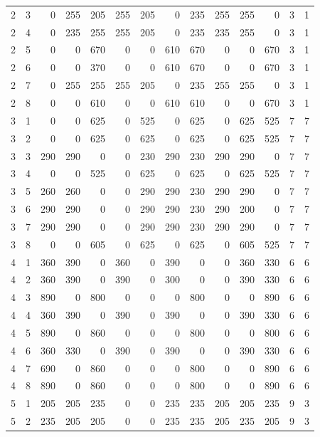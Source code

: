 {\begin{longtable}{cc*{10}{r}cc}
2 & 3 & 0 & 255 & 205 & 255 & 205 & 0 & 235 & 255 & 255 & 0 & 3 & 1 \\
2 & 4 & 0 & 235 & 255 & 255 & 205 & 0 & 235 & 235 & 255 & 0 & 3 & 1 \\
2 & 5 & 0 & 0 & 670 & 0 & 0 & 610 & 670 & 0 & 0 & 670 & 3 & 1 \\
2 & 6 & 0 & 0 & 370 & 0 & 0 & 610 & 670 & 0 & 0 & 670 & 3 & 1 \\
2 & 7 & 0 & 255 & 255 & 255 & 205 & 0 & 235 & 255 & 255 & 0 & 3 & 1 \\
2 & 8 & 0 & 0 & 610 & 0 & 0 & 610 & 610 & 0 & 0 & 670 & 3 & 1 \\\midrule
3 & 1 & 0 & 0 & 625 & 0 & 525 & 0 & 625 & 0 & 625 & 525 & 7 & 7 \\
3 & 2 & 0 & 0 & 625 & 0 & 625 & 0 & 625 & 0 & 625 & 525 & 7 & 7 \\
3 & 3 & 290 & 290 & 0 & 0 & 230 & 290 & 230 & 290 & 290 & 0 & 7 & 7 \\
3 & 4 & 0 & 0 & 525 & 0 & 625 & 0 & 625 & 0 & 625 & 525 & 7 & 7 \\
3 & 5 & 260 & 260 & 0 & 0 & 290 & 290 & 230 & 290 & 290 & 0 & 7 & 7 \\
3 & 6 & 290 & 290 & 0 & 0 & 290 & 290 & 230 & 290 & 200 & 0 & 7 & 7 \\
3 & 7 & 290 & 290 & 0 & 0 & 290 & 290 & 230 & 290 & 290 & 0 & 7 & 7 \\
3 & 8 & 0 & 0 & 605 & 0 & 625 & 0 & 625 & 0 & 605 & 525 & 7 & 7 \\\midrule
4 & 1 & 360 & 390 & 0 & 360 & 0 & 390 & 0 & 0 & 360 & 330 & 6 & 6 \\
4 & 2 & 360 & 390 & 0 & 390 & 0 & 300 & 0 & 0 & 390 & 330 & 6 & 6 \\
4 & 3 & 890 & 0 & 800 & 0 & 0 & 0 & 800 & 0 & 0 & 890 & 6 & 6 \\
4 & 4 & 360 & 390 & 0 & 390 & 0 & 390 & 0 & 0 & 390 & 330 & 6 & 6 \\
4 & 5 & 890 & 0 & 860 & 0 & 0 & 0 & 800 & 0 & 0 & 800 & 6 & 6 \\
4 & 6 & 360 & 330 & 0 & 390 & 0 & 390 & 0 & 0 & 390 & 330 & 6 & 6 \\
4 & 7 & 690 & 0 & 860 & 0 & 0 & 0 & 800 & 0 & 0 & 890 & 6 & 6 \\
4 & 8 & 890 & 0 & 860 & 0 & 0 & 0 & 800 & 0 & 0 & 890 & 6 & 6 \\\midrule
5 & 1 & 205 & 205 & 235 & 0 & 0 & 235 & 235 & 205 & 205 & 235 & 9 & 3 \\
5 & 2 & 235 & 205 & 205 & 0 & 0 & 235 & 235 & 205 & 235 & 205 & 9 & 3 \\

\end{longtable}}
